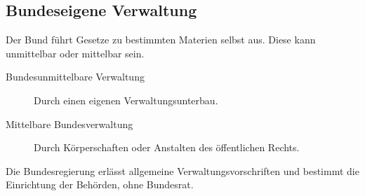 \documentclass{article}
\begin{document}
\subsection{Bundeseigene Verwaltung}
Der Bund führt Gesetze zu bestimmten Materien selbst aus. Diese kann unmittelbar oder mittelbar sein.\begin{description}
 \item[Bundesunmittelbare Verwaltung] Durch einen eigenen Verwaltungsunterbau.
 \item[Mittelbare Bundesverwaltung] Durch Körperschaften oder Anstalten des öffentlichen Rechts.
\end{description}
Die Bundesregierung erlässt allgemeine Verwaltungsvorschriften und bestimmt die Einrichtung der Behörden, ohne Bundesrat.
\end{document}
